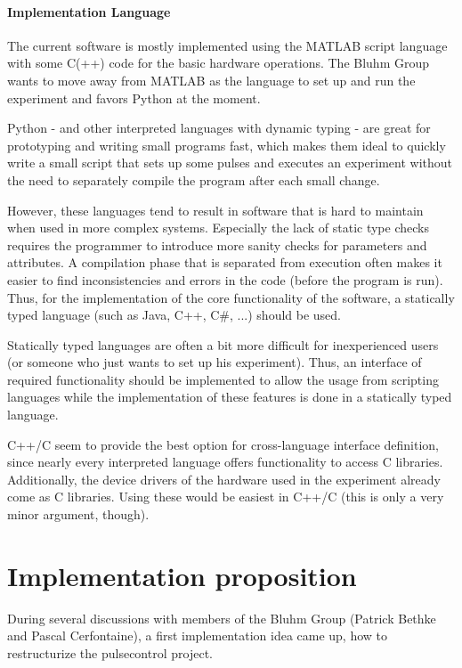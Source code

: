 \documentclass[a4paper,12pt]{article}
\begin{document}
\paragraph{Implementation Language}
The current software is mostly implemented using the MATLAB script language with some C(++) code for the basic hardware operations. The Bluhm Group wants to move away from MATLAB as the language to set up and run the experiment and favors Python at the moment.\par
Python - and other interpreted languages with dynamic typing - are great for prototyping and writing small programs fast, which makes them ideal to quickly write a small script that sets up some pulses and executes an experiment without the need to separately compile the program after each small change.\par
However, these languages tend to result in software that is hard to maintain when used in more complex systems. Especially the lack of static type checks requires the programmer to introduce more sanity checks for parameters and attributes. A compilation phase that is separated from execution often makes it easier to find inconsistencies and errors in the code (before the program is run). Thus, for the implementation of the core functionality of the software, a statically typed language (such as Java, C++, C\#, ...) should be used.\par
Statically typed languages are often a bit more difficult for inexperienced users (or someone who just wants to set up his experiment). Thus, an interface of required functionality should be implemented to allow the usage from scripting languages while the implementation of these features is done in a statically typed language.\par
C++/C seem to provide the best option for cross-language interface definition, since nearly every interpreted language offers functionality to access C libraries. Additionally, the device drivers of the hardware used in the experiment already come as C libraries. Using these would be easiest in C++/C (this is only a very minor argument, though).

\section{Implementation proposition}
During several discussions with members of the Bluhm Group (Patrick Bethke and Pascal Cerfontaine), a first implementation idea came up, how to restructurize the pulsecontrol project.  
\end{document}
